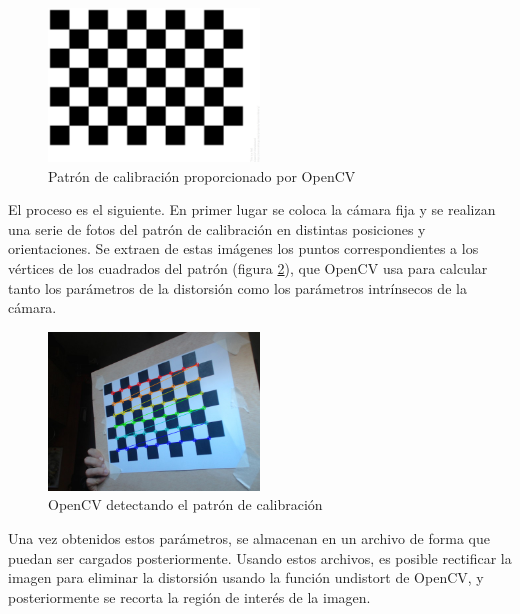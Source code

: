 \begin{figure}[H]
        \centering
        \includegraphics[width=0.5\textwidth]{images/pattern.png}
        \caption{Patrón de calibración proporcionado por OpenCV}
        \label{fig:patron_calibracion}
\end{figure} 

El proceso es el siguiente. En primer lugar se coloca la cámara fija y se realizan una serie de fotos del patrón de calibración en distintas posiciones y orientaciones. Se extraen de estas imágenes los puntos correspondientes a los vértices de los cuadrados del patrón (figura \ref{fig:deteccion_patron}), que OpenCV usa para calcular tanto los parámetros de la distorsión como los parámetros intrínsecos de la cámara.\\

\begin{figure}[H]
        \centering
        \includegraphics[width=0.5\textwidth]{images/calibration_pattern_detected.png}
        \caption{OpenCV detectando el patrón de calibración}
        \label{fig:deteccion_patron}
\end{figure} 

Una vez obtenidos estos parámetros, se almacenan en un archivo de forma que puedan ser cargados posteriormente. Usando estos archivos, es posible rectificar la imagen para eliminar la distorsión usando la función undistort de OpenCV, y posteriormente se recorta la región de interés de la imagen.\\



